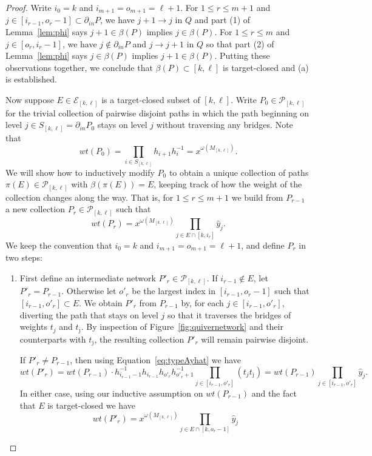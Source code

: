\documentclass[12pt]{amsart}
\newcommand{\gv}{\omega}
\newcommand{\grep}{\gv}
\newcommand{\cE}{\mathcal{E}}
\newcommand{\cP}{\mathcal{P}}
\newcommand{\ol}[1]{\overline{#1}}
\newcommand{\Qrep}{M}
\theoremstyle{remark}
\numberwithin{equation}{section}
\numberwithin{figure}{section}
\begin{document}
\begin{proof}
  Write $i_0=k$ and $i_{m+1}=o_{m+1}=\ell+1$.
  For $1\le r\le m+1$ and $j\in[i_{r-1},o_r-1]\subset\partial_{in}P$, we have $j+1\to j$ in $Q$ and part (1) of Lemma~\ref{lem:phi} says $j+1\in\beta(P)$ implies $j\in\beta(P)$.
  For $1\le r\le m$ and $j\in[o_r,i_r-1]$, we have $j\notin\partial_{in}P$ and $j\to j+1$ in $Q$ so that part (2) of Lemma~\ref{lem:phi} says $j\in\beta(P)$ implies $j+1\in\beta(P)$.
  Putting these observations together, we conclude that $\beta(P)\subset[k,\ell]$ is target-closed and (a) is established.

  Now suppose $E\in\cE_{[k,\ell]}$ is a target-closed subset of $[k,\ell]$.
  Write $P_0\in\cP_{[k,\ell]}$ for the trivial collection of pairwise disjoint paths in which the path beginning on level $j\in S_{[k,\ell]}=\partial_{in}P_0$ stays on level $j$ without traversing any bridges.
  Note that
  \[
    wt(P_0)=\prod_{i \in S_{[k,\ell]}}h_{i+1} h_i^{-1}=x^{\grep(\Qrep_{[k,\ell]})}.
  \]
  We will show how to inductively modify $P_0$ to obtain a unique collection of paths $\pi(E)\in\cP_{[k,\ell]}$ with $\beta(\pi(E))=E$, keeping track of how the weight of the collection changes along the way.
  That is, for $1\le r\le m+1$ we build from $P_{r-1}$ a new collection $P_r \in \cP_{[k,\ell]}$ such that
  \[
    wt(P_r) = x^{\grep(\Qrep_{[k,\ell]})} \prod_{j \in E \cap [k,i_r]} \hat{y}_j.
  \]
  We keep the convention that $i_0=k$ and $i_{m+1}=o_{m+1}=\ell+1$, and define $P_r$ in two steps:
  \begin{enumerate}
    \item
      First define an intermediate network $P'_r \in \cP_{[k,\ell]}$.
      If $i_{r-1} \notin E$, let $P'_r=P_{r-1}$.
      Otherwise let $o'_r$ be the largest index in $[i_{r-1},o_r-1]$ such that $[i_{r-1},o'_r]\subset E$.
      We obtain $P'_r$ from $P_{r-1}$ by, for each $j\in[i_{r-1},o'_r]$, diverting the path that stays on level $j$ so that it traverses the bridges of weights $t_j$ and $t_{\ol{\jmath}}$.
      By inspection of Figure~\ref{fig:quivernetwork} and their counterparts with $t_{\ol{\jmath}}$, the resulting collection $P'_r$ will remain pairwise disjoint.

      If $P'_r \neq P_{r-1}$, then using Equation~\eqref{eq:typeAyhat} we have
      \[
        wt(P'_r)=wt(P_{r-1})\cdot h_{i_{r-1}-1}^{-1}h_{i_{r-1}}h_{o'_r}h_{o'_r+1}^{-1}\prod_{j\in[i_{r-1},o'_r]}(t_jt_{\ol{\jmath}}) = wt(P_{r-1})\prod_{j \in [i_{r-1},o'_r]} \hat{y}_j.
      \]
      In either case, using our inductive assumption on $wt(P_{r-1})$ and the fact that $E$ is target-closed we have
      \[
        wt(P'_r) = x^{\grep(\Qrep_{[k,\ell]})} \prod_{j \in E \cap [k,o_{r}-1]} \hat{y}_j
      \]


\end{enumerate}
\end{proof}
\end{document}
